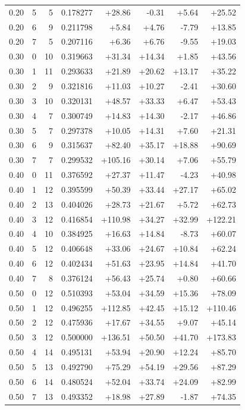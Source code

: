 \documentclass[journal,onecolumn,10pt]{IEEEtran}
\begin{document}
\begin{longtable}{@{}lrrrrrrr@{}}
0.20 & 5 & 5 & 0.178277 & +28.86 & -0.31 & +5.64 & +25.52 \\
0.20 & 6 & 9 & 0.211798 & +5.84 & +4.76 & -7.79 & +13.85 \\
0.20 & 7 & 5 & 0.207116 & +6.36 & +6.76 & -9.55 & +19.03 \\
0.30 & 0 & 10 & 0.319663 & +31.34 & +14.34 & +1.85 & +43.56 \\
0.30 & 1 & 11 & 0.293633 & +21.89 & +20.62 & +13.17 & +35.22 \\
0.30 & 2 & 9 & 0.321816 & +11.03 & +10.27 & -2.41 & +30.60 \\
0.30 & 3 & 10 & 0.320131 & +48.57 & +33.33 & +6.47 & +53.43 \\
0.30 & 4 & 7 & 0.300749 & +14.83 & +14.30 & -2.17 & +46.86 \\
0.30 & 5 & 7 & 0.297378 & +10.05 & +14.31 & +7.60 & +21.31 \\
0.30 & 6 & 9 & 0.315637 & +82.40 & +35.17 & +18.88 & +90.69 \\
0.30 & 7 & 7 & 0.299532 & +105.16 & +30.14 & +7.06 & +55.79 \\
0.40 & 0 & 11 & 0.376592 & +27.37 & +11.47 & -4.23 & +40.98 \\
0.40 & 1 & 12 & 0.395599 & +50.39 & +33.44 & +27.17 & +65.02 \\
0.40 & 2 & 13 & 0.404026 & +28.73 & +21.67 & +5.72 & +62.73 \\
0.40 & 3 & 12 & 0.416854 & +110.98 & +34.27 & +32.99 & +122.21 \\
0.40 & 4 & 10 & 0.384925 & +16.63 & +14.84 & -8.73 & +60.07 \\
0.40 & 5 & 12 & 0.406648 & +33.06 & +24.67 & +10.84 & +62.24 \\
0.40 & 6 & 12 & 0.402434 & +51.63 & +23.95 & +14.84 & +41.70 \\
0.40 & 7 & 8 & 0.376124 & +56.43 & +25.74 & +0.80 & +60.66 \\
0.50 & 0 & 12 & 0.510393 & +53.04 & +34.59 & +15.36 & +78.09 \\
0.50 & 1 & 12 & 0.496255 & +112.85 & +42.45 & +15.12 & +110.46 \\
0.50 & 2 & 12 & 0.475936 & +17.67 & +34.55 & +9.07 & +45.14 \\
0.50 & 3 & 12 & 0.500000 & +136.51 & +50.50 & +41.70 & +173.83 \\
0.50 & 4 & 14 & 0.495131 & +53.94 & +20.90 & +12.24 & +85.70 \\
0.50 & 5 & 13 & 0.492790 & +75.29 & +54.19 & +29.56 & +87.29 \\
0.50 & 6 & 14 & 0.480524 & +52.04 & +33.74 & +24.09 & +82.99 \\
0.50 & 7 & 13 & 0.493352 & +18.98 & +27.89 & -1.87 & +74.35 \\
\end{longtable}
\endgroup
\end{document}
